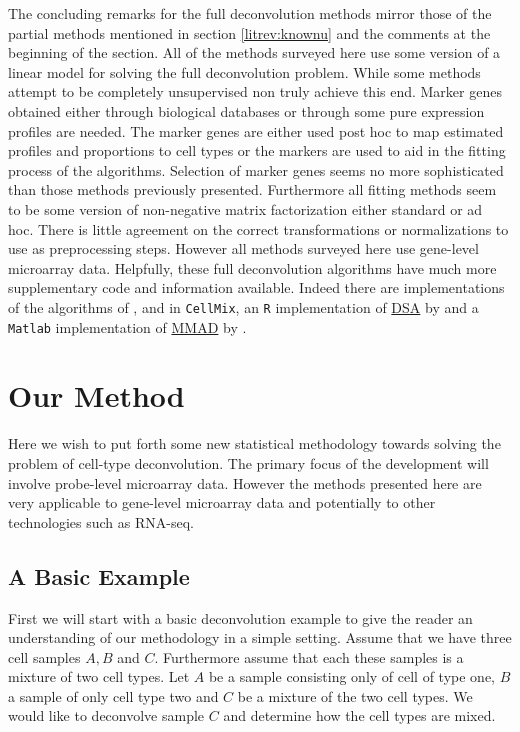 \documentclass[reqno,12pt,oneside]{report}\usepackage[]{graphicx}\usepackage[]{color}
\theoremstyle{plain}
\theoremstyle{definition}
\theoremstyle{remark}
\numberwithin{theorem}{chapter}     %
\begin{document}
The concluding remarks for the full deconvolution methods mirror those of the partial methods mentioned in section \ref{litrev:knownu} and the comments at the beginning of the section. All of the methods surveyed here use some version of a linear model for solving the full deconvolution problem. While some methods attempt to be completely unsupervised non truly achieve this end. Marker genes obtained either through biological databases or through some pure expression profiles are needed. The marker genes are either used post hoc to map estimated profiles and proportions to cell types or the markers are used to aid in the fitting process of the algorithms. Selection of marker genes seems no more sophisticated than those methods previously presented. Furthermore all fitting methods seem to be some version of non-negative matrix factorization either standard or ad hoc. There is little agreement on the correct transformations or normalizations to use as preprocessing steps. However all methods surveyed here use gene-level microarray data. Helpfully, these full deconvolution algorithms have much more supplementary code and information available. Indeed there are implementations of the algorithms of \citeauthor{Gaujoux2012}, and \citeauthor{Repsilber2010} in \verb+CellMix+, an \verb+R+ implementation of \href{https://github.com/zhandong/DSA}{DSA} by \citeauthor{Zhong2013} and a \verb+Matlab+ implementation of \href{https://sourceforge.net/projects/mmad/}{MMAD} by \citeauthor{Liebner2014}.



 \chapter{Our Method}
 \label{chap:Method}

Here we wish to put forth some new statistical methodology towards solving the problem of cell-type deconvolution. The primary focus of the development will involve probe-level microarray data. However the methods presented here are very applicable to gene-level microarray data and potentially to other technologies such as RNA-seq. 

\section{A Basic Example}

First we will start with a basic deconvolution example to give the reader an understanding of our methodology in a simple setting. Assume that we have three cell samples $A,B$ and $C$. Furthermore assume that each these samples is a mixture of two cell types. Let $A$ be a sample consisting only of cell of type one, $B$ a sample of only cell type two and $C$ be a mixture of the two cell types. We would like to deconvolve sample $C$ and determine how the cell types are mixed. 
\end{document}
